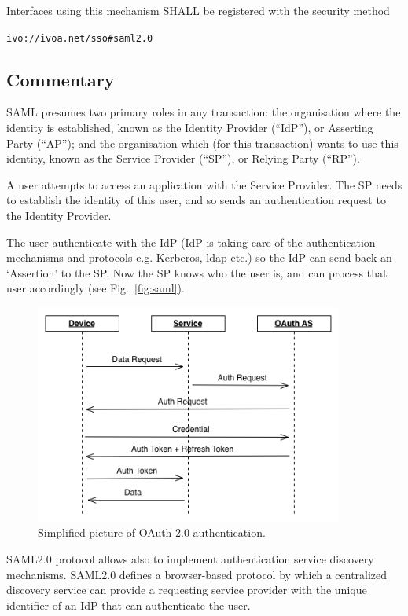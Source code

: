 \documentclass[11pt,a4paper]{ivoa}
\begin{document}
Interfaces using this mechanism SHALL  be registered with the security method 

\texttt{ivo://ivoa.net/sso\#saml2.0}


\subsection{Commentary}
SAML presumes two primary roles in any transaction: the organisation where the identity is established, 
known as the Identity Provider (``IdP''), or Asserting Party (``AP''); 
and the organisation which (for this transaction) wants to use this identity, known as the Service Provider (``SP''), 
or Relying Party (``RP'').

A user attempts to access an application with the Service Provider. 
The SP needs to establish the identity of this user, and so sends an authentication request to the Identity Provider. 

The user authenticate with the IdP (IdP is taking care of the authentication mechanisms and protocols e.g. Kerberos, ldap etc.) so the IdP can send back an `Assertion' to the SP. 
Now the SP knows who the user is, and can process that user accordingly (see Fig.~\ref{fig:saml}).
\begin{figure}
\centering
\includegraphics[width=0.9\textwidth]{SSO_image003.png}
\caption{Simplified picture of OAuth 2.0 authentication.} 
\label{fig:oauth}
\end{figure}
 
SAML2.0 protocol allows also to implement authentication service discovery mechanisms. SAML2.0  defines a browser-based protocol 
by which a centralized discovery service can provide a requesting service provider with the unique identifier of an 
IdP that can authenticate the user.  
\end{document}
